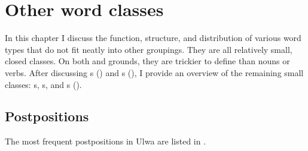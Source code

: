 \chapter{Other word classes}\label{sec:8}


In this chapter I discuss the function, structure, and distribution of various word types that do not fit neatly into other groupings. They are all relatively small, closed classes. On both  and  grounds, they are trickier to define than nouns or verbs. After discussing s () and s (), I provide an overview of the remaining small classes: s, s, and s ().


\section{Postpositions}\label{sec:8.1}


The most frequent postpositions in Ulwa are listed in .

